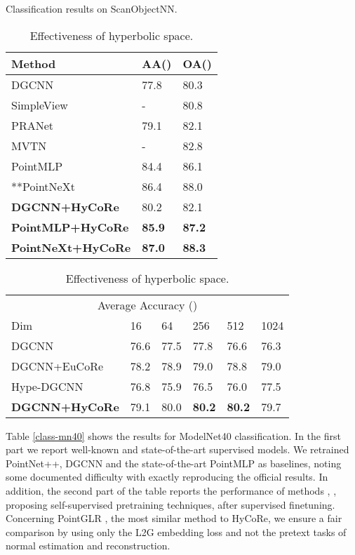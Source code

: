\documentclass{article}
\begin{document}
\begin{table}
\begin{minipage}{.5\linewidth}
  \caption{Classification results on ScanObjectNN.}
  \setlength\tabcolsep{3pt} 
  \label{class-sonn}
  \centering
  \begin{tabular}{lll}
    \toprule
Method     & AA()     & OA()  \\
    \midrule
    DGCNN\cite{wang2019dynamic}       &77.8 & 80.3 \\
    SimpleView\cite{goyal2021revisiting}  & - & 80.8 \\
    PRANet\cite{cheng2021net}     &79.1& 82.1 \\
    MVTN\cite{hamdi2021mvtn}       & - & 82.8 \\
    PointMLP\cite{ma2022rethinking}     & 84.4 & 86.1 \\
    **PointNeXt\cite{qian2022pointnext} & 86.4 & 88.0 \\ 
    \midrule
    \textbf{DGCNN+HyCoRe}    & 80.2  &   82.1    \\
    \textbf{PointMLP+HyCoRe} & \textbf{85.9}  &   \textbf{87.2}   \\
    \textbf{PointNeXt+HyCoRe} & \textbf{87.0}  &   \textbf{88.3}   \\
    \bottomrule
  \end{tabular}
\end{minipage}
\begin{minipage}{.5\linewidth}
\caption{Effectiveness of hyperbolic space.}
  \setlength\tabcolsep{2pt} 
  \label{class-emdim}
  \centering
  \begin{tabular}{llllll}
    \toprule
    \multicolumn{6}{c}{Average Accuracy ()}                   \\
    \cmidrule(r){1-6}
    Dim     & 16     & 64 & 256 & 512 & 1024\\
    \midrule
    DGCNN           &  76.6 & 77.5 & 77.8 &  76.6 & 76.3   \\
    DGCNN+EuCoRe       & 78.2 & 78.9 & 79.0 &  78.8  &  79.0      \\
    Hype-DGCNN      & 76.8 & 75.9 & 76.5 &  76.0 & 77.5        \\
    \textbf{DGCNN+HyCoRe}  &  79.1  & 80.0 & \textbf{80.2} & \textbf{80.2}  & 79.7   \\
    \bottomrule
  \end{tabular}
  \end{minipage}
\end{table}

Table \ref{class-mn40} shows the results for ModelNet40 classification. In the first part we report
well-known and state-of-the-art supervised models. We retrained PointNet++, DGCNN and the state-of-the-art PointMLP as baselines, noting some documented difficulty \cite{github_pointmlp} with exactly reproducing the official results. In addition, the second part of the table reports the performance of methods \cite{sauder2019self}, \cite{huang2021spatio}, \cite{fu2022distillation} proposing self-supervised pretraining techniques, after supervised finetuning. Concerning PointGLR \cite{rao2020global}, the most similar method to HyCoRe, we ensure a fair comparison by using only the L2G embedding loss and not the pretext tasks of normal estimation and reconstruction.  
\end{document}
